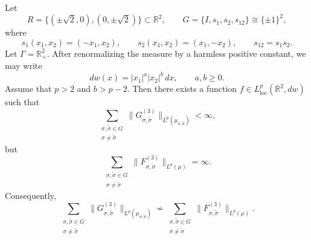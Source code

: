 \documentclass[12pt]{amsart}
\begin{document}
\begin{lemma}\label{lem:counterexample-2d-cross-terms}
Let
\[
R=\{(\pm \sqrt2,0),(0,\pm \sqrt2)\}\subset \mathbb R^2,
\qquad
G=\{I,s_1,s_2,s_{12}\}\cong \{\pm 1\}^2,
\]
where
\[
s_1(x_1,x_2)=(-x_1,x_2),\qquad
s_2(x_1,x_2)=(x_1,-x_2),\qquad
s_{12}=s_1s_2.
\]
Let \(\Gamma=\mathbb R_+^2\). After renormalizing the measure by a harmless positive constant, we may write
\[
dw(x)=|x_1|^a|x_2|^b\,dx,
\qquad a,b\ge 0.
\]
Assume that \(p>2\) and \(b>p-2\). Then there exists a function
\(f\in L^p_{\mathrm{loc}}(\mathbb R^2,dw)\) such that
\[
\sum_{\substack{\sigma,\tilde{\sigma}\in G\\ \sigma\neq \tilde{\sigma}}}
\|G_{\sigma,\tilde{\sigma}}^{(3)}\|_{L^p(\mu_{\sigma,\tilde{\sigma}})}
<\infty,
\]
but
\[
\sum_{\substack{\sigma,\tilde{\sigma}\in G\\ \sigma\neq \tilde{\sigma}}}
\|F_{\sigma,\tilde{\sigma}}^{(3)}\|_{L^p(\mu)}
=\infty.
\]
Consequently,
\[
\sum_{\substack{\sigma,\tilde{\sigma}\in G\\ \sigma\neq \tilde{\sigma}}}
\|G_{\sigma,\tilde{\sigma}}^{(3)}\|_{L^p(\mu_{\sigma,\tilde{\sigma}})}
\not\sim
\sum_{\substack{\sigma,\tilde{\sigma}\in G\\ \sigma\neq \tilde{\sigma}}}
\|F_{\sigma,\tilde{\sigma}}^{(3)}\|_{L^p(\mu)}.
\]
\end{lemma}
\end{document}
